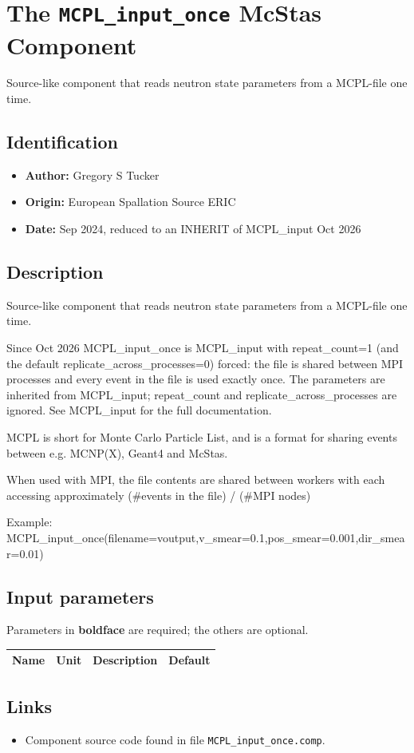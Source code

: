 \section{The \texttt{MCPL\_input\_once} McStas Component}
Source-like component that reads neutron state parameters from a MCPL-file one time.

\subsection*{Identification}
\begin{itemize}
  \item \textbf{Author:} Gregory S Tucker
  \item \textbf{Origin:} European Spallation Source ERIC
  \item \textbf{Date:} Sep 2024, reduced to an INHERIT of MCPL\_input Oct 2026
\end{itemize}

\subsection*{Description}
Source-like component that reads neutron state parameters from a MCPL-file one time.

Since Oct 2026 MCPL\_input\_once is MCPL\_input with repeat\_count=1 (and the default replicate\_across\_processes=0) forced: the file is shared between MPI processes and every event in the file is used exactly once. The parameters are inherited from MCPL\_input; repeat\_count and replicate\_across\_processes are ignored. See MCPL\_input for the full documentation.

MCPL is short for Monte Carlo Particle List, and is a format for sharing events between e.g. MCNP(X), Geant4 and McStas.

When used with MPI, the file contents are shared between workers with each accessing approximately (\#events in the file) / (\#MPI nodes)

Example: MCPL\_input\_once(filename=voutput,v\_smear=0.1,pos\_smear=0.001,dir\_smear=0.01)

\subsection*{Input parameters}
Parameters in \textbf{boldface} are required; the others are optional.

\begin{longtable}{p{}p{}p{}p{}}
\toprule
\textbf{Name} & \textbf{Unit} & \textbf{Description} & \textbf{Default} \\
\midrule
\endhead
\bottomrule
\end{longtable}

\subsection*{Links}
\begin{itemize}
  \item Component source code found in file \texttt{MCPL\_input\_once.comp}.
\end{itemize}
